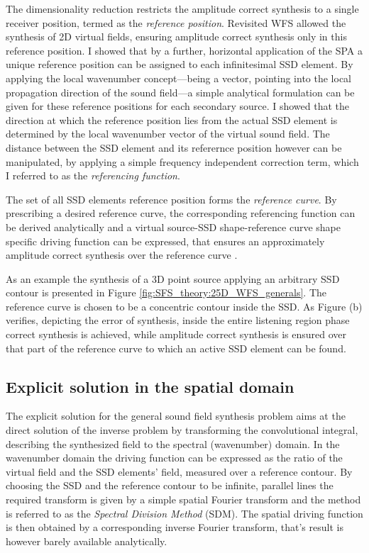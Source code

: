 \documentclass[10pt,twoside]{article}
\theoremstyle{thesisgroupstyle}
\theoremstyle{indented}
\begin{document}
The dimensionality reduction restricts the amplitude correct synthesis to a single receiver position, termed as the \emph{reference position}.
Revisited WFS allowed the synthesis of 2D virtual fields, ensuring amplitude correct synthesis only in this reference position.
I showed that by a further, horizontal application of the SPA a unique reference position can be assigned to each infinitesimal SSD element.
By applying the local wavenumber concept---being a vector, pointing into the local propagation direction of the sound field---a simple analytical formulation can be given for these reference positions for each secondary source.
I showed that the direction at which the reference position lies from the actual SSD element is determined by the local wavenumber vector of the virtual sound field.
The distance between the SSD element and its referernce position however can be manipulated, by applying a simple frequency independent correction term, which I referred to as the \emph{referencing function}.

The set of all SSD elements reference position forms the \emph{reference curve}.
By prescribing a desired reference curve, the corresponding referencing function can be derived analytically and a virtual source-SSD shape-reference curve shape specific driving function can be expressed, that ensures an approximately amplitude correct synthesis over the reference curve \cite{Firtha2016_booklet}.

As an example the synthesis of a 3D point source applying an arbitrary SSD contour is presented in Figure \ref{fig:SFS_theory:25D_WFS_generals}.
The reference curve is chosen to be a concentric contour inside the SSD.
As Figure (b) verifies, depicting the error of synthesis, inside the entire listening region phase correct synthesis is achieved, while amplitude correct synthesis is ensured over that part of the reference curve to which an active SSD element can be found.

\subsection{Explicit solution in the spatial domain}
The explicit solution for the general sound field synthesis problem aims at the direct solution of the inverse problem by transforming the convolutional integral, describing the synthesized field to the spectral (wavenumber) domain.
In the wavenumber domain the driving function can be expressed as the ratio of the virtual field and the SSD elements' field, measured over a reference contour.
By choosing the SSD and the reference contour to be infinite, parallel lines the required transform is given by a simple spatial Fourier transform and the method is referred to as the \emph{Spectral Division Method } (SDM).
The spatial driving function is then obtained by a corresponding inverse Fourier transform, that's result is however barely available analytically.
\end{document}
